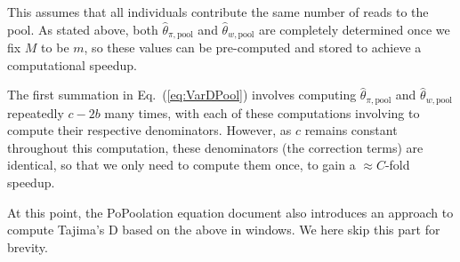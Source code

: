 \documentclass[a4paper,fontsize=9pt,DIV=14]{scrartcl}
\newcounter{todo}
\newcommand\todo[1]{{\stepcounter{todo}\color{purple}{TODO \arabic{todo}: #1}}}
\newcommand\eqnref[1]{Eq.~(\ref{#1})}
\begin{document}
This assumes that all individuals contribute the same number of reads to the pool.
As stated above, both $\widehat{\theta}_{\pi,\text{pool}}$ and $\widehat{\theta}_{w, \text{pool}}$ are completely determined once we fix $M$ to be $m$, so these values can be pre-computed and stored to achieve a computational speedup.

The first summation in \eqnref{eq:VarDPool} involves computing $\widehat{\theta}_{\pi,\text{pool}}$ and 
$\widehat{\theta}_{w,\text{pool}}$ repeatedly $c-2b$ many times, 
with each of these computations involving to compute their respective denominators.
However, as $c$ remains constant throughout this computation, these denominators (the correction terms)
are identical, so that we only need to compute them once, to gain a $\approx C$-fold speedup.

At this point, the PoPoolation equation document also introduces an approach to compute Tajima's D based on the above in windows.
We here skip this part for brevity.




\end{document}
